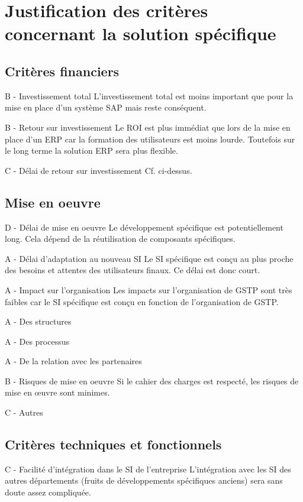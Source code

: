 \section{Justification des critères concernant la solution spécifique}

\subsection{Critères financiers}

B - Investissement total
L'investissement total est moins important que pour la mise en place d'un
système SAP mais reste conséquent.

B - Retour sur investissement
Le ROI est plus immédiat que lors de la mise en place d'un ERP car la
formation des utilisateurs est moins lourde. Toutefois sur le long terme la
solution ERP sera plus flexible.

C - Délai de retour sur investissement
Cf. ci-dessus.

\subsection{Mise en oeuvre}

D - Délai de mise en oeuvre
Le développement spécifique est potentiellement long. Cela dépend de la
réutilisation de composants spécifiques.

A - Délai d'adaptation au nouveau SI
Le SI spécifique est conçu au plus proche des besoins et attentes des
utilisateurs finaux. Ce délai est donc court.

A - Impact sur l'organisation
Les impacts sur l'organisation de GSTP sont très faibles car le SI
spécifique est conçu en fonction de l'organisation de GSTP.

	A - Des structures

	A - Des processus

	A - De la relation avec les partenaires

B - Risques de mise en oeuvre
Si le cahier des charges est respecté, les risques de mise en \oe{}uvre
sont minimes.

C - Autres

\subsection{Critères techniques et fonctionnels}

C - Facilité d'intégration dans le SI de l'entreprise
L'intégration avec les SI des autres départements (fruits de développements
spécifiques anciens) sera sans doute assez compliquée.

